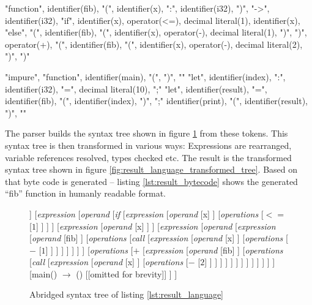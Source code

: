 \begin{codelisting}[caption="Abridged tokens of listing \ref{lst:result_language}"]
"function", identifier(fib), "(", identifier(x), ":", identifier(i32), ")", "->", identifier(i32),
    "if", identifier(x), operator(<=), decimal literal(1),
        identifier(x),
    "else",
        "(", identifier(fib), "(", identifier(x), operator(-), decimal literal(1), ")", ")", operator(+), "(", identifier(fib), "(", identifier(x), operator(-), decimal literal(2), ")", ")"

"impure", "function", identifier(main), "(", ")",
"{"
    "let", identifier(index), ":", identifier(i32), "=", decimal literal(10), ";"
    "let", identifier(result), "=", identifier(fib), "(", identifier(index), ")", ";"
    identifier(print), "(", identifier(result), ")",
"}"
\end{codelisting}

The parser builds the syntax tree shown in figure \ref{fig:result_language_parser_tree} from these tokens. This syntax tree is then transformed in various ways: Expressions are rearranged, variable references resolved, types checked etc. The result is the transformed syntax tree shown in figure \ref{fig:result_language_transformed_tree}. Based on that byte code is generated -- listing \ref{lst:result_bytecode} shows the generated ``fib'' function in humanly readable format.

\begin{figure}
\centering
\begin{forest}
[\textit{file}
	[{fib() $\rightarrow$ i32}
		[\textit{arguments}
			[{x : i32}]
		]
		[\textit{expression}
			[\textit{operand}
				[\textit{if}
					[\textit{expression}
						[\textit{operand}
							[x]
						]
						[\textit{operations}
							[{$<=$}
								[{$1$}]
							]
						]
					]
					[\textit{expression}
						[\textit{operand}
							[x]
						]
					]
					[\textit{expression}
						[\textit{operand}
							[\textit{expression}
								[\textit{operand}
									[fib]
								]
								[\textit{operations}
									[\textit{call}
										[\textit{expression}
											[\textit{operand}
												[x]
											]
											[\textit{operations}
												[{$-$}
													[{$1$}]
												]
											]
										]
									]
								]
							]
						]
						[\textit{operations}
							[{$+$}
								[\textit{expression}
									[\textit{operand}
										[fib]
									]
									[\textit{operations}
										[\textit{call}
											[\textit{expression}
												[\textit{operand}
													[x]
												]
												[\textit{operations}
													[{$-$}
														[{$2$}]
													]
												]
											]
										]
									]
								]
							]
						]
					]
				]
			]
		]
	]
	[{main() $\rightarrow$ ()}
		[{[omitted for brevity]}]
	]
]
\end{forest}
\caption{Abridged syntax tree of listing \ref{lst:result_language}}
\label{fig:result_language_parser_tree}
\end{figure}

